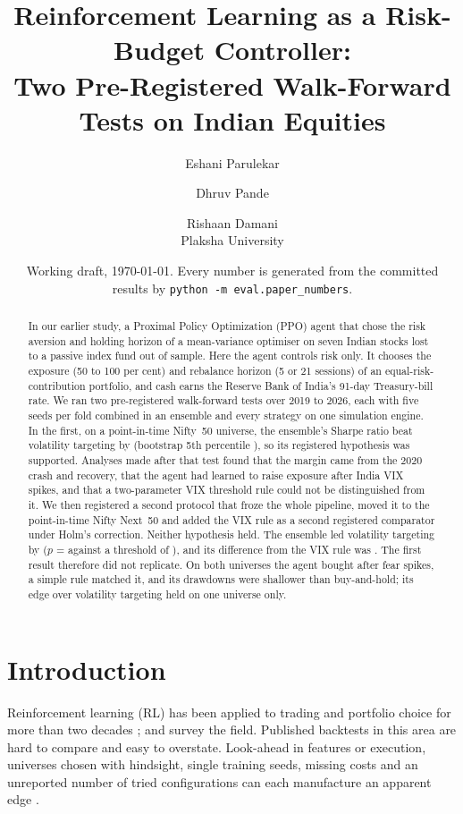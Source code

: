 \documentclass[11pt]{article}
\title{Reinforcement Learning as a Risk-Budget Controller:\\
Two Pre-Registered Walk-Forward Tests on Indian Equities}
\author{Eshani Parulekar \and Dhruv Pande \and Rishaan Damani\\[2pt]
\small Plaksha University}
\date{\small Working draft, \today. Every number is generated from the committed results by \texttt{python -m eval.paper\_numbers}.}
\begin{document}
\maketitle

\begin{abstract}
In our earlier study, a Proximal Policy Optimization (PPO) agent that chose the risk aversion and holding horizon of a mean-variance optimiser on seven Indian stocks lost to a passive index fund out of sample. Here the agent controls risk only. It chooses the exposure (50 to 100 per cent) and rebalance horizon (5 or 21 sessions) of an equal-risk-contribution portfolio, and cash earns the Reserve Bank of India's 91-day Treasury-bill rate. We ran two pre-registered walk-forward tests over 2019 to 2026, each with five seeds per fold combined in an ensemble and every strategy on one simulation engine. In the first, on a point-in-time Nifty~50 universe, the ensemble's Sharpe ratio beat volatility targeting by \HiDelta{} (bootstrap 5th percentile \HiPfive{}), so its registered hypothesis was supported. Analyses made after that test found that the margin came from the 2020 crash and recovery, that the agent had learned to raise exposure after India VIX spikes, and that a two-parameter VIX threshold rule could not be distinguished from it. We then registered a second protocol that froze the whole pipeline, moved it to the point-in-time Nifty Next~50 and added the VIX rule as a second registered comparator under Holm's correction. Neither hypothesis held. The ensemble led volatility targeting by \NxHOneDelta{} ($p$ = \NxHOneP{} against a threshold of \NxHOneThr{}), and its difference from the VIX rule was \NxHTwoDelta{}. The first result therefore did not replicate. On both universes the agent bought after fear spikes, a simple rule matched it, and its drawdowns were shallower than buy-and-hold; its edge over volatility targeting held on one universe only.
\end{abstract}

\section{Introduction}

Reinforcement learning (RL) has been applied to trading and portfolio choice for more than two decades \citep{moody1998,moody2001,deng2017,jiang2017,zhang2020drl,yang2020ensemble,liu2020finrl}; \citet{hambly2023} and \citet{pippas2024} survey the field. Published backtests in this area are hard to compare and easy to overstate. Look-ahead in features or execution, universes chosen with hindsight, single training seeds, missing costs and an unreported number of tried configurations can each manufacture an apparent edge \citep{brown1992,bailey2014notices,henderson2018,lopezdeprado2018}.
\end{document}
